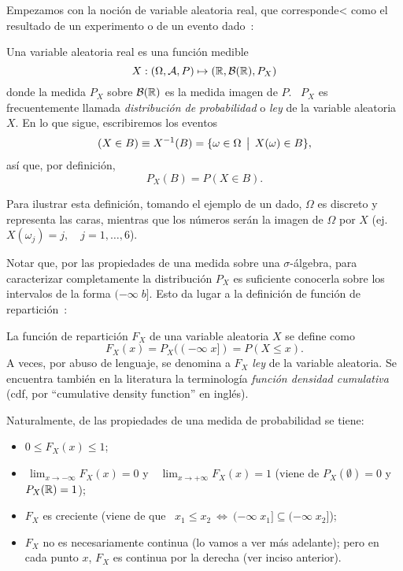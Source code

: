 Empezamos con  la noci\'on de variable  aleatoria real, que  corresponde< como el
resultado de un experimento o de un evento dado~\cite{AthLah06, Coh13, Bre88}:
%
\begin{definicion}
\label{Def:MP:VariableAleatotiaReal}
%
  Una variable aleatoria real es una funci\'on medible
  \[
  X: (\Omega,\mathcal{A},P) \mapsto (\mathbb{R},\mathcal{B}(\mathbb{R}),P_X)
  \]
  donde la medida  $P_X$ sobre $\mathcal{B}(\mathbb{R})$ es la medida imagen  de $P$.  \ $P_X$
  es frecuentemente llamada {\it distribuci\'on  de probabilidad} o {\it ley} de
  la variable aleatoria $X$. En lo que sigue, escribiremos los eventos
  \[
  (X \in B) \equiv X^{-1}(B) = \{ \omega \in \Omega \:\: \big| \:\: X(\omega) \in B \},
  \]
  as\'i que, por definici\'on,
  \[
  P_X(B) = P(X \in B).
  \]
\end{definicion}
%
Para  ilustrar esta definici\'on,  tomando el  ejemplo de  un dado,  $\Omega$ es
discreto y representa las caras,  mientras que los n\'umeros    ser\'an  la  imagen  de  $\Omega$  por  $X$
(ej. $X(\omega_j) = j, \quad j = 1, \ldots , 6$).

Notar que, por las propiedades  de una medida sobre una $\sigma$-\'algebra, para
caracterizar completamente la distribuci\'on $P_X$ es suficiente conocerla sobre
los intervalos de la forma $(-\infty \; b]$.  Esto da lugar a la definici\'on de
funci\'on de repartici\'on~\cite{AthLah06, Coh13, Bre88, HogMck13}:
%
\begin{definicion}
\label{Def:MP:FuncionReparticion}
%
La funci\'on de repartici\'on $F_X$ de una variable aleatoria $X$ se define como
  \[
  F_X(x) = P_X((-\infty \; x]) = P(X \le x).
  \]
  A veces, por abuso  de lenguaje, se denomina a $F_X$ {\it  ley} de la variable
  aleatoria.  Se encuentra  tambi\'en en  la literatura  la  terminolog\'ia {\it
    funci\'on densidad cumulativa} (cdf,  por ``cumulative density function'' en
  ingl\'es).
\end{definicion}
%
Naturalmente, de las propiedades de una medida de probabilidad se tiene:
%
\begin{itemize}
\item $0 \le F_X(x) \le 1$;
%
\item $\displaystyle \, \lim_{x \to -\infty} F_X(x) = 0$ y \ $\displaystyle \,
  \lim_{x \to +\infty} F_X(x) = 1$  (viene de $P_X(\emptyset) = 0$ y $P_X(\mathbb{R})
  = 1$);
%
\item $F_X$ es creciente \big(viene de  que \ $x_1 \le x_2 \: \Leftrightarrow \:
  (-\infty \; x_1] \subseteq (-\infty \; x_2]$\big);
%
\item $F_X$ no es necesariamente continua  (lo vamos a ver m\'as adelante); pero
  en cada punto $x$, $F_X$ es continua por la derecha (ver inciso anterior).
\end{itemize}



